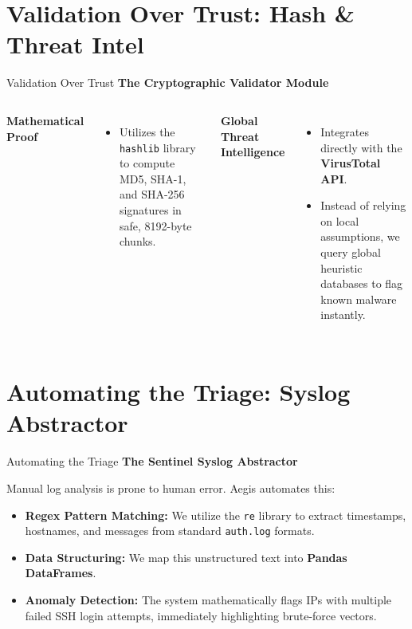 \documentclass[aspectratio=169]{beamer}
\begin{document}
\section{Validation Over Trust: Hash \& Threat Intel}

\begin{frame}{Validation Over Trust}
    \textbf{The Cryptographic Validator Module}
    \vspace{0.3cm}
    
    \begin{columns}
        \textbf{Mathematical Proof}
        \begin{itemize}
            \item Utilizes the \texttt{hashlib} library to compute MD5, SHA-1, and SHA-256 signatures in safe, 8192-byte chunks.
        \end{itemize}
        
        \textbf{Global Threat Intelligence}
        \begin{itemize}
            \item Integrates directly with the \textbf{VirusTotal API}.
            \item Instead of relying on local assumptions, we query global heuristic databases to flag known malware instantly.
        \end{itemize}
    \end{columns}
\end{frame}

\section{Automating the Triage: Syslog Abstractor}

\begin{frame}{Automating the Triage}
    \textbf{The Sentinel Syslog Abstractor}
    \vspace{0.3cm}
    
    Manual log analysis is prone to human error. Aegis automates this:
    \begin{itemize}
        \item \textbf{Regex Pattern Matching:} We utilize the \texttt{re} library to extract timestamps, hostnames, and messages from standard \texttt{auth.log} formats.
        \item \textbf{Data Structuring:} We map this unstructured text into \textbf{Pandas DataFrames}.
        \item \textbf{Anomaly Detection:} The system mathematically flags IPs with multiple failed SSH login attempts, immediately highlighting brute-force vectors.
    \end{itemize}
\end{frame}
\end{document}
